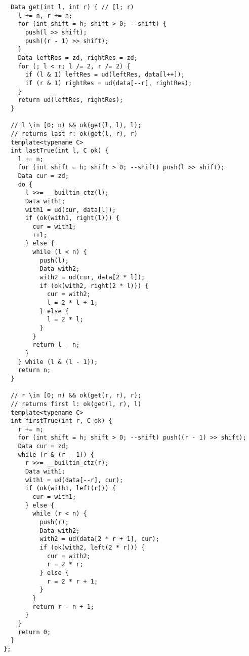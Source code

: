 \begin{lstlisting}
  Data get(int l, int r) { // [l; r)
    l += n, r += n;
    for (int shift = h; shift > 0; --shift) {
      push(l >> shift);
      push((r - 1) >> shift);
    }
    Data leftRes = zd, rightRes = zd;
    for (; l < r; l /= 2, r /= 2) {
      if (l & 1) leftRes = ud(leftRes, data[l++]);
      if (r & 1) rightRes = ud(data[--r], rightRes);
    }
    return ud(leftRes, rightRes);
  }

  // l \in [0; n) && ok(get(l, l), l);
  // returns last r: ok(get(l, r), r)
  template<typename C>
  int lastTrue(int l, C ok) {
    l += n;
    for (int shift = h; shift > 0; --shift) push(l >> shift);
    Data cur = zd;
    do {
      l >>= __builtin_ctz(l);
      Data with1;
      with1 = ud(cur, data[l]);
      if (ok(with1, right(l))) {
        cur = with1;
        ++l;
      } else {
        while (l < n) {
          push(l);
          Data with2;
          with2 = ud(cur, data[2 * l]);
          if (ok(with2, right(2 * l))) {
            cur = with2;
            l = 2 * l + 1;
          } else {
            l = 2 * l;
          }
        }
        return l - n;
      }
    } while (l & (l - 1));
    return n;
  }

  // r \in [0; n) && ok(get(r, r), r);
  // returns first l: ok(get(l, r), l)
  template<typename C>
  int firstTrue(int r, C ok) {
    r += n;
    for (int shift = h; shift > 0; --shift) push((r - 1) >> shift);
    Data cur = zd;
    while (r & (r - 1)) {
      r >>= __builtin_ctz(r);
      Data with1;
      with1 = ud(data[--r], cur);
      if (ok(with1, left(r))) {
        cur = with1;
      } else {
        while (r < n) {
          push(r);
          Data with2;
          with2 = ud(data[2 * r + 1], cur);
          if (ok(with2, left(2 * r))) {
            cur = with2;
            r = 2 * r;
          } else {
            r = 2 * r + 1;
          }
        }
        return r - n + 1;
      }
    }
    return 0;
  }
};
\end{lstlisting}
